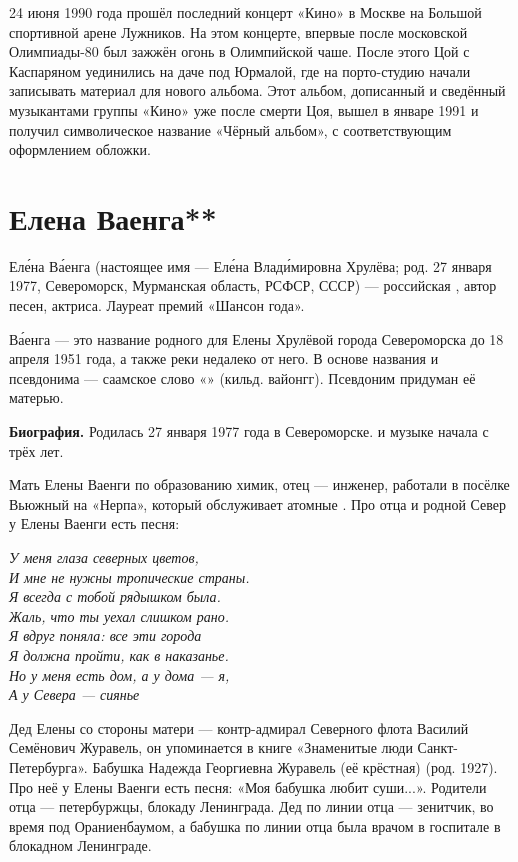 24 июня 1990 года прошёл последний концерт «Кино» в Москве на Большой спортивной арене Лужников. На этом концерте, впервые после московской Олимпиады-80 был зажжён огонь в Олимпийской чаше. После этого Цой с Каспаряном уединились на даче под Юрмалой, где на порто-студию начали записывать материал для нового альбома. Этот альбом, дописанный и сведённый музыкантами группы «Кино» уже после смерти Цоя, вышел в январе 1991 и получил символическое название «Чёрный альбом», с соответствующим оформлением обложки.

\newpage
\section{Елена Ваенга**}
Ел\'{е}на В\'{а}енга (настоящее имя --- Ел\'{е}на Влад\'{и}мировна Хрулёва; род. 27 января 1977, Североморск, Мурманская область, РСФСР, СССР) --- российская , автор песен, актриса. Лауреат премий «Шансон года».

В\'{а}енга --- это название родного для Елены Хрулёвой города Североморска до 18 апреля 1951 года, а также реки недалеко от него. В основе названия и псевдонима --- саамское слово «» (кильд. вайонгг). Псевдоним придуман её матерью.

\textbf{Биография.} Родилась 27 января 1977 года в Североморске.  и  музыке начала с трёх лет.

Мать Елены Ваенги по образованию химик, отец --- инженер, работали в посёлке Вьюжный на  «Нерпа», который обслуживает атомные . Про отца и родной Север у Елены Ваенги есть песня:

{\it У меня глаза северных цветов,\\
И мне не нужны тропические страны.\\
Я всегда с тобой рядышком была.\\
Жаль, что ты уехал слишком рано.\\
Я вдруг поняла: все эти города\\
Я должна пройти, как в наказанье.\\
Но у меня есть дом, а у дома --- я,\\
А у Севера --- сиянье}

Дед Елены со стороны матери --- контр-адмирал Северного флота Василий Семёнович Журавель, он упоминается в книге «Знаменитые люди Санкт-Петербурга». Бабушка Надежда Георгиевна Журавель (её крёстная) (род. 1927). Про неё у Елены Ваенги есть песня: «Моя бабушка любит суши...». Родители отца ---  петербуржцы,  блокаду Ленинграда. Дед по линии отца --- зенитчик, во время   под Ораниенбаумом, а бабушка по линии отца была врачом в госпитале в блокадном Ленинграде.

